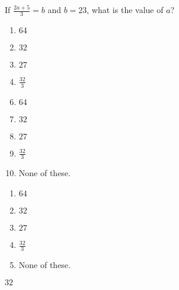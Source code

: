  
If $\frac{2a+5}{3}=b$ and $b=23$, what is the value of $a$?\\


\ifsat
	\begin{enumerate}[label=\Alph*)]
		\item $64$ 
		\item $32$ %
		\item $27$
		\item $\frac{32}{3}$
	\end{enumerate}
\else
\fi

\ifacteven
	\begin{enumerate}[label=\textbf{\Alph*.},itemsep=\fill,align=left]
		\setcounter{enumii}{5}
		\item $64$ 
		\item $32$ %
		\item $27$
		\addtocounter{enumii}{1}
		\item $\frac{32}{3}$
		\item None of these. 
	\end{enumerate}
\else
\fi

\ifactodd
	\begin{enumerate}[label=\textbf{\Alph*.},itemsep=\fill,align=left]
		\item $64$ 
		\item $32$ %
		\item $27$
		\item $\frac{32}{3}$
		\item None of these. 
	\end{enumerate}
\else
\fi

\ifgridin
 $32$ %
		
\else
\fi

